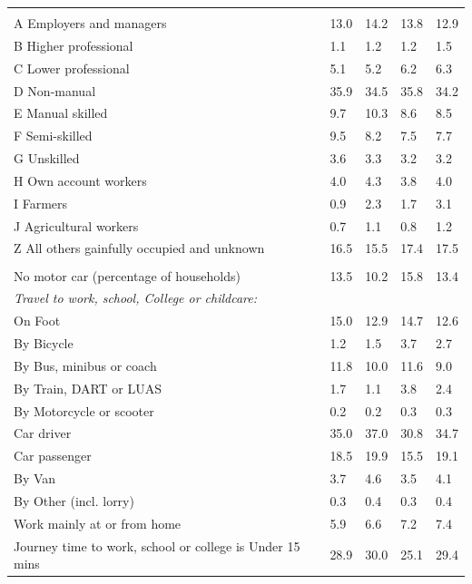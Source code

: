 \documentclass{article}
\begin{document}
\begin{table}[h]
\begin{tabular}{KTTTT}
\hline
    \\ 
    \hline
A Employers and managers & 13.0& 14.2& 13.8& 12.9\\
B Higher professional & 1.1& 1.2& 1.2& 1.5\\
C Lower professional & 5.1& 5.2& 6.2& 6.3\\
D Non-manual & 35.9& 34.5& 35.8& 34.2\\
E Manual skilled &  9.7& 10.3&  8.6&  8.5\\
F Semi-skilled & 9.5& 8.2& 7.5& 7.7\\
G Unskilled & 3.6& 3.3& 3.2& 3.2\\
H Own account workers & 4.0& 4.3& 3.8& 4.0\\
I Farmers & 0.9& 2.3& 1.7& 3.1\\
J Agricultural workers & 0.7& 1.1& 0.8& 1.2\\
Z All others gainfully occupied and unknown & 16.5& 15.5& 17.4& 17.5\\
\hline
{}\hline
    \\ 
    \hline
No motor car (percentage of households) & 13.5& 10.2& 15.8& 
13.4\\
    \hline 
\emph{Travel to work, school, College or childcare:} & & & \\
\quad On Foot & 15.0& 12.9& 14.7& 12.6\\ 
\quad By Bicycle & 1.2& 1.5& 3.7& 2.7\\ 
\quad By Bus, minibus or coach & 11.8& 10.0& 11.6&  9.0\\
\quad By Train, DART or LUAS & 1.7& 1.1& 3.8& 2.4\\
\quad By Motorcycle or scooter & 0.2& 0.2& 0.3& 0.3\\
\quad Car driver & 35.0 & 37.0& 30.8& 34.7\\
\quad Car passenger & 18.5& 19.9& 15.5& 19.1\\
\quad By Van & 3.7& 4.6& 3.5& 4.1\\
\quad By Other (incl. lorry) & 0.3& 0.4& 0.3& 0.4\\
    \hline
Work mainly at or from home & 5.9& 6.6& 7.2& 7.4\\
Journey time to work, school or college is Under 15 mins & 28.9& 30.0& 25.1& 29.4\\

\end{tabular}
\end{table}
\end{document}

